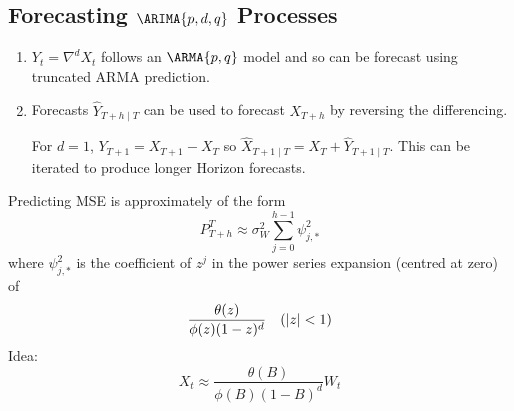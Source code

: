 \subsection*{Forecasting $ \ARIMA{p,d,q} $ Processes}
\begin{enumerate}[(1)]
    \item $ Y_t=\nabla^d X_t $ follows an $ \ARMA{p,q} $ model
          and so can be forecast using truncated ARMA prediction.
    \item Forecasts $ \hat{Y}_{T+h\mid T} $ can be used to forecast $ X_{T+h} $
          by reversing the differencing.
          \begin{Example}{}{}
              For $ d=1 $, $ Y_{T+1}=X_{T+1}-X_{T} $ so $ \hat{X}_{T+1\mid T}=X_T+\hat{Y}_{T+1\mid T} $.
              This can be iterated to produce longer Horizon forecasts.
          \end{Example}
\end{enumerate}
Predicting MSE is approximately of the form
\[ P_{T+h}^T\approx \sigma_W^2 \sum_{j=0}^{h-1} \psi^2_{j,*} \]
where $  \psi^2_{j,*} $ is the coefficient of $ z^j $ in the
power series expansion (centred at zero) of
\[ \frac{\theta(z)}{\phi(z)(1-z)^d} \quad(\lvert z\rvert<1) \]
Idea:
\[ X_t \approx \frac{\theta(B)}{\phi(B)(1-B)^d}W_t  \]

